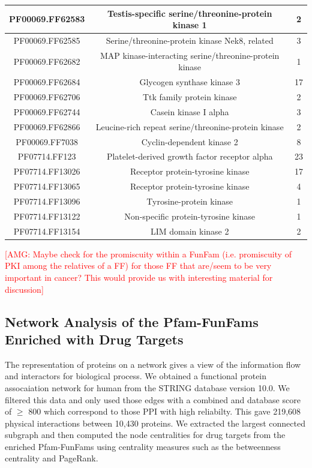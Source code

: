 \documentclass[a4paper, 11pt]{article}
\newcommand{\redcomment}[1]{\textcolor{red}{[#1]}} %
\begin{document}
\begin{table}[H]
\begin{tabular}{|c|c|c|}
PF00069.FF62583 & Testis-specific serine/threonine-protein kinase 1              & 2            \\ \hline
PF00069.FF62585 & Serine/threonine-protein kinase Nek8, related                  & 3            \\ \hline
PF00069.FF62682 & MAP kinase-interacting serine/threonine-protein kinase         & 1            \\ \hline
PF00069.FF62684 & Glycogen synthase kinase 3                                     & 17           \\ \hline
PF00069.FF62706 & Ttk family protein kinase                                      & 2            \\ \hline
PF00069.FF62744 & Casein kinase I alpha                                          & 3            \\ \hline
PF00069.FF62866 & Leucine-rich repeat serine/threonine-protein kinase            & 2            \\ \hline
PF00069.FF7038  & Cyclin-dependent kinase 2                                      & 8            \\ \hline
PF07714.FF123   & Platelet-derived growth factor receptor alpha                  & 23           \\ \hline
PF07714.FF13026 & Receptor protein-tyrosine kinase                               & 17           \\ \hline
PF07714.FF13065 & Receptor protein-tyrosine kinase                               & 4            \\ \hline
PF07714.FF13096 & Tyrosine-protein kinase                                        & 1            \\ \hline
PF07714.FF13122 & Non-specific protein-tyrosine kinase                           & 1            \\ \hline
PF07714.FF13154 & LIM domain kinase 2                                            & 2            \\ \hline
\end{tabular}
\end{table}

\redcomment{AMG: Maybe check for the promiscuity within a FunFam (i.e. promiscuity of PKI among the relatives of a FF) for those FF that are/seem to be very important in cancer? This would provide us with interesting material for discussion}

\subsection*{Network Analysis of the Pfam-FunFams Enriched with Drug Targets}
The representation of proteins on a network gives a view of the information flow and interactors for biological process. We obtained a functional protein assocaiation network for human from the STRING database version 10.0. We filtered this data and only used those edges with a combined and database score of $\geq$ 800 which correspond to those PPI with high reliabilty. This gave 219,608 physical interactions between 10,430 proteins. We extracted the largest connected subgraph and then computed the node centralities for drug targets from the enriched Pfam-FunFams using centrality measures such as the betweenness centrality and PageRank. 
\end{document}
